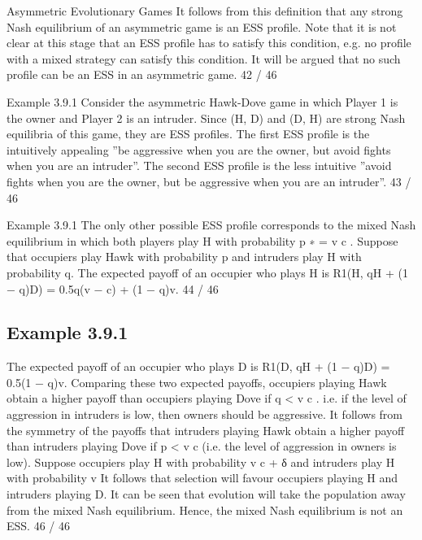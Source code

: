 \documentclass[]{report}
\begin{document}
Asymmetric Evolutionary Games
It follows from this definition that any strong Nash equilibrium of
an asymmetric game is an ESS profile.
Note that it is not clear at this stage that an ESS profile has to
satisfy this condition, e.g. no profile with a mixed strategy can
satisfy this condition. It will be argued that no such profile can be
an ESS in an asymmetric game.
42 / 46

Example 3.9.1
Consider the asymmetric Hawk-Dove game in which Player 1 is the
owner and Player 2 is an intruder.
Since (H, D) and (D, H) are strong Nash equilibria of this game,
they are ESS profiles.
The first ESS profile is the intuitively appealing ”be aggressive
when you are the owner, but avoid fights when you are an
intruder”.
The second ESS profile is the less intuitive ”avoid fights when you
are the owner, but be aggressive when you are an intruder”.
43 / 46

Example 3.9.1
The only other possible ESS profile corresponds to the mixed Nash
equilibrium in which both players play H with probability p
∗ =
v
c
.
Suppose that occupiers play Hawk with probability p and intruders
play H with probability q.
The expected payoff of an occupier who plays H is
R1(H, qH + (1 − q)D) = 0.5q(v − c) + (1 − q)v.
44 / 46
\subsection{Example 3.9.1}
The expected payoff of an occupier who plays D is
R1(D, qH + (1 − q)D) = 0.5(1 − q)v.
Comparing these two expected payoffs, occupiers playing Hawk
obtain a higher payoff than occupiers playing Dove if q <
v
c
.
i.e. if the level of aggression in intruders is low, then owners should
be aggressive.
It follows from the symmetry of the payoffs that intruders playing
Hawk obtain a higher payoff than intruders playing Dove if p <
v
c
(i.e. the level of aggression in owners is low).
Suppose occupiers play H with probability v
c + δ and intruders play
H with probability v
It follows that selection will favour occupiers playing H and
intruders playing D.
It can be seen that evolution will take the population away from
the mixed Nash equilibrium. Hence, the mixed Nash equilibrium is
not an ESS.
46 / 46
\end{document}
